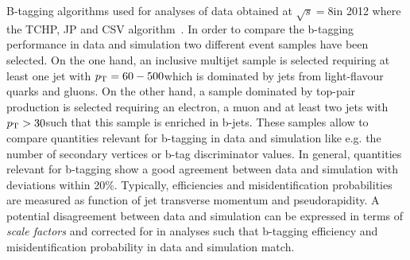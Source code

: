 B-tagging algorithms used for analyses of data obtained at $\sqrt{s} = 8$\tev in 2012 where the TCHP, JP and CSV algorithm~\cite{CMS-PAS-BTV-13-001}. In order to compare the b-tagging performance in data and simulation two different event samples have been selected. On the one hand, an inclusive multijet sample is selected requiring at least one jet with $p_{\text{T}} = 60 - 500$\gev which is dominated by jets from light-flavour quarks and gluons. On the other hand, a sample dominated by top-pair production is selected requiring an electron, a muon and at least two jets with $p_{\text{T}}>30$\gev such that this sample is enriched in b-jets. These samples allow to compare quantities relevant for b-tagging in data and simulation like e.g. the number of secondary vertices or b-tag discriminator values. In general, quantities relevant for b-tagging show a good agreement between data and simulation with deviations within 20\%. Typically, efficiencies and misidentification probabilities are measured as function of jet transverse momentum and pseudorapidity. A potential disagreement between data and simulation can be expressed in terms of \textit{scale factors} and corrected for in analyses such that b-tagging efficiency and misidentification probability in data and simulation match. 


